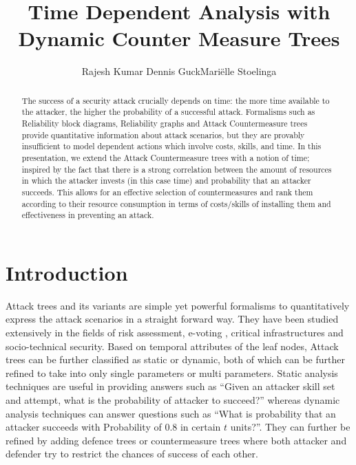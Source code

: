 \documentclass[submission,copyright,creativecommons]{eptcs}
\title{Time Dependent Analysis with \\Dynamic Counter Measure Trees}
\author{Rajesh Kumar \qquad Dennis Guck\qquad Mari{\"e}lle Stoelinga
\institute{Formal Methods and Tools\\
University of Twente\\
Enschede, Netherlands}
\email{\{r.kumar,d.guck,m.i.a.stoelinga\}@utwente.nl}
}
\begin{document}
\maketitle

\begin{abstract}
The success of a security attack crucially depends on time: the more time available to the attacker, the higher the probability of a successful attack. Formalisms such as Reliability block diagrams, Reliability graphs and Attack Countermeasure trees provide quantitative information about attack scenarios, but they are provably insufficient to model dependent actions which involve costs, skills, and time. In this presentation, we extend the Attack Countermeasure trees with a notion of time; inspired by the fact that there is a strong correlation between the amount of resources in which the attacker invests (in this case time) and probability that an attacker succeeds. This allows for an effective selection of countermeasures and rank them according to their resource consumption in terms of costs/skills of installing them and effectiveness in preventing an attack.
\end{abstract}

\section{Introduction}

Attack trees \cite{Schneier} and its variants\cite{ATformal} are simple yet powerful formalisms to quantitatively express the attack scenarios in a straight forward way. They have been studied extensively in the fields of risk assessment\cite{Paul}, e-voting \cite{2006}, critical infrastructures\cite{Byres13} and socio-technical security\cite{Reddy}. Based on temporal attributes of the leaf nodes, Attack trees can be further classified as static or dynamic, both of which can be further refined to take into only single parameters\cite{ADT}\cite{singleparam} or multi parameters\cite{multiparam}. Static analysis techniques are useful in providing answers such as ``Given an attacker skill set and attempt, what is the probability of attacker to succeed?'' whereas dynamic analysis techniques can answer questions such as ``What is probability that an attacker succeeds with Probability of 0.8 in certain $t$ units?''. They can further be refined by adding defence trees\cite{DT} or countermeasure trees\cite{ACT} where both attacker and defender try to restrict the chances of success of each other.
\end{document}
